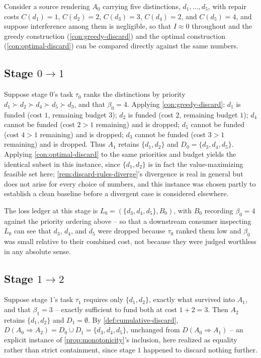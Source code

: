 Consider a source rendering $A_0$ carrying five distinctions, $d_1,
\ldots, d_5$, with repair costs $C(d_1) = 1$, $C(d_2) = 2$, $C(d_3) = 3$,
$C(d_4) = 2$, and $C(d_5) = 4$, and suppose interference among them is
negligible, so that $I \approx 0$ throughout and the greedy construction
(\cref{con:greedy-discard}) and the optimal construction
(\cref{con:optimal-discard}) can be compared directly against the same
numbers.

\subsection{Stage \texorpdfstring{$0 \to 1$}{0 to 1}}

Suppose stage $0$'s task $\tau_0$ ranks the distinctions by priority
$d_1 \succ d_2 \succ d_4 \succ d_5 \succ d_3$, and that $\beta_0 = 4$.
Applying \cref{con:greedy-discard}: $d_1$ is funded (cost $1$, remaining
budget $3$); $d_2$ is funded (cost $2$, remaining budget $1$); $d_4$
cannot be funded (cost $2 > 1$ remaining) and is dropped; $d_5$ cannot be
funded (cost $4 > 1$ remaining) and is dropped; $d_3$ cannot be funded
(cost $3 > 1$ remaining) and is dropped. Thus $A_1$ retains $\{d_1, d_2\}$
and $D_0 = \{d_3, d_4, d_5\}$. Applying \cref{con:optimal-discard} to the
same priorities and budget yields the identical subset in this instance,
since $\{d_1, d_2\}$ is in fact the value-maximizing feasible set here;
\cref{rem:discard-rules-diverge}'s divergence is real in general but does
not arise for every choice of numbers, and this instance was chosen partly
to establish a clean baseline before a divergent case is considered
elsewhere.

The loss ledger at this stage is $L_0 = (\{d_3, d_4, d_5\}, B_0)$, with
$B_0$ recording $\beta_0 = 4$ against the priority ordering above -- so
that a downstream consumer inspecting $L_0$ can see that $d_3$, $d_4$, and
$d_5$ were dropped because $\tau_0$ ranked them low and $\beta_0$ was
small relative to their combined cost, not because they were judged
worthless in any absolute sense.

\subsection{Stage \texorpdfstring{$1 \to 2$}{1 to 2}}

Suppose stage $1$'s task $\tau_1$ requires only $\{d_1, d_2\}$, exactly
what survived into $A_1$, and that $\beta_1 = 3$ -- exactly sufficient to
fund both at cost $1 + 2 = 3$. Then $A_2$ retains $\{d_1, d_2\}$ and $D_1 =
\emptyset$. By \cref{def:cumulative-discard}, $D(A_0 \Rightarrow A_2) =
D_0 \cup D_1 = \{d_3, d_4, d_5\}$, unchanged from $D(A_0 \Rightarrow A_1)$
-- an explicit instance of \cref{prop:monotonicity}'s inclusion, here
realized as equality rather than strict containment, since stage $1$
happened to discard nothing further.

